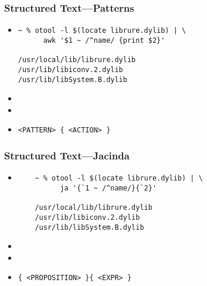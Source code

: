 \documentclass{beamer}
\begin{document}
\begin{frame}[fragile]
  \frametitle{Structured Text---Patterns}
  \begin{itemize}
    \item
      \begin{verbatim}
~ % otool -l $(locate librure.dylib) | \
      awk '$1 ~ /^name/ {print $2}'

/usr/local/lib/librure.dylib
/usr/lib/libiconv.2.dylib
/usr/lib/libSystem.B.dylib
      \end{verbatim}
      \item\nil{}
      \item\nil{}
      \item \verb|<PATTERN> { <ACTION> }|
  \end{itemize}
\end{frame}

\begin{frame}[fragile]
  \frametitle{Structured Text---Jacinda}
  \begin{itemize}
    \item
      \begin{verbatim}
    ~ % otool -l $(locate librure.dylib) | \
          ja '{`1 ~ /^name/}{`2}'

    /usr/local/lib/librure.dylib
    /usr/lib/libiconv.2.dylib
    /usr/lib/libSystem.B.dylib
      \end{verbatim}
    \item\nil{}
    \item\nil{}
    \item \verb|{ <PROPOSITION> }{ <EXPR> }|
  \end{itemize}
\end{frame}
\end{document}
